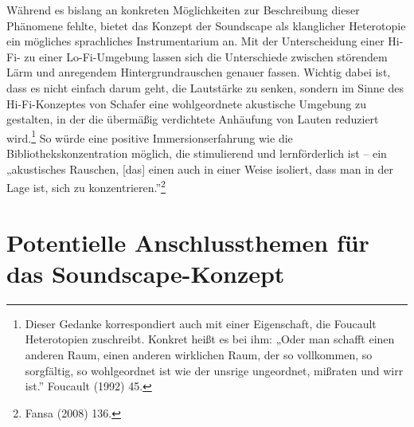 \documentclass[a4paper,
fontsize=11pt,
oneside,
numbers=noperiodatend,
parskip=half-,
bibliography=totoc,
final
]{scrartcl}
\begin{document}
Während es bislang an konkreten Möglichkeiten zur Beschreibung dieser
Phänomene fehlte, bietet das Konzept der Soundscape als klanglicher
Heterotopie ein mögliches sprachliches Instrumentarium an. Mit der
Unterscheidung einer Hi-Fi- zu einer Lo-Fi-Umgebung lassen sich die
Unterschiede zwischen störendem Lärm und anregendem Hintergrundrauschen
genauer fassen. Wichtig dabei ist, dass es nicht einfach darum geht, die
Lautstärke zu senken, sondern im Sinne des Hi-Fi-Konzeptes von Schafer
eine wohlgeordnete akustische Umgebung zu gestalten, in der die
übermäßig verdichtete Anhäufung von Lauten reduziert wird.\footnote{Dieser
  Gedanke korrespondiert auch mit einer Eigenschaft, die Foucault
  Heterotopien zuschreibt. Konkret heißt es bei ihm: „Oder man schafft
  einen anderen Raum, einen anderen wirklichen Raum, der so vollkommen,
  so sorgfältig, so wohlgeordnet ist wie der unsrige ungeordnet,
  mißraten und wirr ist.'' Foucault (1992) 45.} So würde eine positive
Immersionserfahrung wie die Bibliothekskonzentration möglich, die
stimulierend und lernförderlich ist -- ein „akustisches Rauschen,
{[}das{]} einen auch in einer Weise isoliert, dass man in der Lage ist,
sich zu konzentrieren.''\footnote{Fansa (2008) 136.}

\hypertarget{potentielle-anschlussthemen-fuxfcr-das-soundscape-konzept}{%
\section{Potentielle Anschlussthemen für das
Soundscape-Konzept}\label{potentielle-anschlussthemen-fuxfcr-das-soundscape-konzept}}
\end{document}
